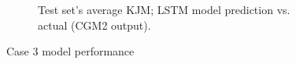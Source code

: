 \documentclass[../main.tex]{subfiles}
\begin{document}
\begin{figure}[ht!]
\begin{subfigure}[b]{0.515\textwidth}
         \label{fig:case3-prediction-performance}
         \caption{Test set's average \ac{KJM}; LSTM model prediction vs. actual (CGM2 output).}
     \end{subfigure}
    \caption{Case 3 model performance}
    \label{fig:case3-performance-plots}
\end{figure}

\end{document}
